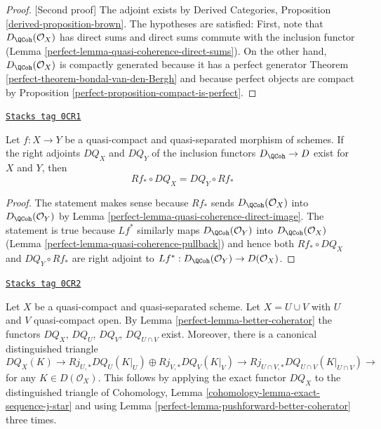 \begin{proof}
[Second proof]
The adjoint exists by Derived Categories, Proposition
\ref{derived-proposition-brown}. The hypotheses are satisfied:
First, note that $D_\QCoh(\mathcal{O}_X)$ has direct sums
and direct sums commute with the inclusion functor
(Lemma \ref{perfect-lemma-quasi-coherence-direct-sums}).
On the other hand, $D_\QCoh(\mathcal{O}_X)$
is compactly generated because it has a perfect
generator Theorem \ref{perfect-theorem-bondal-van-den-Bergh}
and because perfect objects are compact by
Proposition \ref{perfect-proposition-compact-is-perfect}.
\end{proof}

\begin{lemma}
\label{perfect-lemma-pushforward-better-coherator}
\href{https://stacks.math.columbia.edu/tag/0CR1}{\texttt{Stacks tag 0CR1}}

Let $f : X \to Y$ be a quasi-compact and quasi-separated
morphism of schemes. If the right adjoints $DQ_X$ and $DQ_Y$
of the inclusion functors $D_\QCoh \to D$ exist for $X$ and $Y$, then
$$
Rf_* \circ DQ_X = DQ_Y \circ Rf_*
$$
\end{lemma}

\begin{proof}

The statement makes sense because $Rf_*$ sends
$D_\QCoh(\mathcal{O}_X)$ into $D_\QCoh(\mathcal{O}_Y)$ by
Lemma \ref{perfect-lemma-quasi-coherence-direct-image}.
The statement is true because $Lf^*$ similarly maps
$D_\QCoh(\mathcal{O}_Y)$ into $D_\QCoh(\mathcal{O}_X)$
(Lemma \ref{perfect-lemma-quasi-coherence-pullback})
and hence both $Rf_* \circ DQ_X$ and $DQ_Y \circ Rf_*$
are right adjoint to $Lf^* : D_\QCoh(\mathcal{O}_Y) \to D(\mathcal{O}_X)$.
\end{proof}

\begin{remark}
\label{perfect-remark-explain-consequence}
\href{https://stacks.math.columbia.edu/tag/0CR2}{\texttt{Stacks tag 0CR2}}

Let $X$ be a quasi-compact and quasi-separated scheme.
Let $X = U \cup V$ with $U$ and $V$ quasi-compact open.
By Lemma \ref{perfect-lemma-better-coherator} the functors
$DQ_X$, $DQ_U$, $DQ_V$, $DQ_{U \cap V}$ exist. Moreover, there is a
canonical distinguished triangle
$$
DQ_X(K) \to Rj_{U, *}DQ_U(K|_U) \oplus Rj_{V, *}DQ_V(K|_V)
\to Rj_{U \cap V, *}DQ_{U \cap V}(K|_{U \cap V}) \to
$$
for any $K \in D(\mathcal{O}_X)$. This follows by applying the
exact functor $DQ_X$ to the distinguished triangle of
Cohomology, Lemma \ref{cohomology-lemma-exact-sequence-j-star}
and using Lemma \ref{perfect-lemma-pushforward-better-coherator} three times.
\end{remark}

